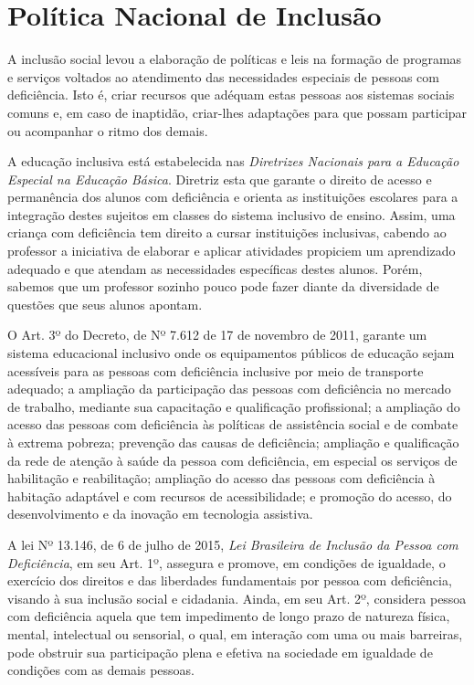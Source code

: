 \documentclass[brasil]{abnt}
\begin{document}
\chapter{Política Nacional de Inclusão}
	A inclusão social levou a elaboração de políticas e leis na formação de programas e serviços voltados ao atendimento das necessidades especiais de pessoas com deficiência. Isto é, criar recursos que 
	adéquam estas pessoas aos sistemas sociais comuns e, em caso de inaptidão, criar-lhes adaptações para que possam participar ou acompanhar o ritmo dos demais. 
	
	A educação inclusiva está estabelecida nas \textit{Diretrizes Nacionais para a Educação Especial na Educação Básica}. Diretriz esta que garante o direito de acesso e permanência dos alunos com deficiência e orienta as instituições escolares para a integração destes sujeitos em classes do sistema inclusivo de ensino. Assim, uma criança com deficiência tem direito a cursar instituições 
	inclusivas, cabendo ao professor a iniciativa de elaborar e aplicar atividades propiciem um aprendizado adequado e que atendam as necessidades específicas destes alunos.
	Porém, sabemos que um professor sozinho pouco pode fazer diante da diversidade de questões que seus alunos apontam. 
		
	O Art. 3º do Decreto, de Nº 7.612 de 17 de novembro de 2011, garante um sistema educacional inclusivo onde os equipamentos públicos de educação sejam acessíveis para as pessoas com deficiência 
	inclusive por meio de transporte adequado; a ampliação da participação das pessoas com deficiência no mercado de trabalho, mediante sua capacitação e qualificação profissional; a 
	ampliação do acesso das pessoas com deficiência às políticas de assistência social e de combate à extrema pobreza; prevenção das causas de deficiência; ampliação e qualificação da rede de atenção à saúde 
	da pessoa com deficiência, em especial os serviços de habilitação e reabilitação; ampliação do acesso das pessoas com deficiência à habitação adaptável e com recursos de acessibilidade; e promoção do acesso, 
	do desenvolvimento e da inovação em tecnologia assistiva. 
						
	A lei Nº 13.146, de 6 de julho de 2015, \textit{Lei Brasileira de Inclusão da Pessoa com Deficiência}, em seu Art. 1º, assegura e promove, em condições de igualdade, o exercício dos direitos 
	e das liberdades fundamentais por pessoa com deficiência, visando à sua inclusão social e cidadania. Ainda, em seu Art. 2º, considera pessoa com deficiência aquela que tem impedimento de longo prazo de natureza 
	física, mental, intelectual ou sensorial, o qual, em interação com uma ou mais barreiras, pode obstruir sua participação plena e efetiva na sociedade em igualdade de condições com as demais pessoas. 
	
\end{document}
